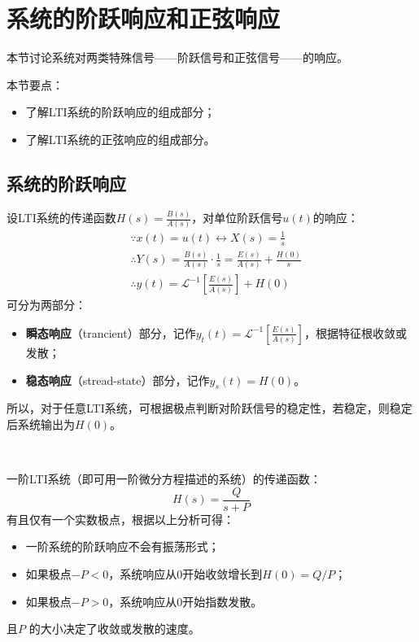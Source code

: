 \section{系统的阶跃响应和正弦响应}

本节讨论系统对两类特殊信号——阶跃信号和正弦信号——的响应。

本节要点：
\begin{itemize}
    \item 了解LTI系统的阶跃响应的组成部分；
    \item 了解LTI系统的正弦响应的组成部分。
\end{itemize}

\subsection{系统的阶跃响应}

设LTI系统的传递函数$H\left( s \right) =\frac{B\left( s \right)}{A\left( s \right)}$，对单位阶跃信号$u\left( t \right) $的响应：
\begin{align*}
&\because x\left( t \right) =u\left( t \right) \longleftrightarrow X\left( s \right) =\frac{1}{s} \\
&\therefore Y\left( s \right) =\frac{B\left( s \right)}{A\left( s \right)}\cdot \frac{1}{s}=\frac{E\left( s \right)}{A\left( s \right)}+\frac{H\left( 0 \right)}{s} \\
&\therefore y\left( t \right) =\mathscr{L} ^{-1}\left[ \frac{E\left( s \right)}{A\left( s \right)} \right] +H\left( 0 \right)
\end{align*}
可分为两部分：
\begin{itemize}
    \item {\bf 瞬态响应}（trancient）部分，记作$y_t\left( t \right) =\mathscr{L} ^{-1}\left[ \frac{E\left( s \right)}{A\left( s \right)} \right] $，根据特征根收敛或发散；
    \item {\bf 稳态响应}（stread-state）部分，记作$y_s\left( t \right) =H\left( 0 \right) $。
\end{itemize}
所以，对于任意LTI系统，可根据极点判断对阶跃信号的稳定性，若稳定，则稳定后系统输出为$H\left( 0 \right) $。

~

一阶LTI系统（即可用一阶微分方程描述的系统）的传递函数：
\[
H\left( s \right) =\frac{Q}{s+P}
\]
有且仅有一个实数极点，根据以上分析可得：
\begin{itemize}
    \item 一阶系统的阶跃响应不会有振荡形式；
    \item 如果极点$-P<0$，系统响应从0开始收敛增长到$H\left( 0 \right) =Q/P$；
    \item 如果极点$-P>0$，系统响应从0开始指数发散。
\end{itemize}
且$P$ 的大小决定了收敛或发散的速度。

